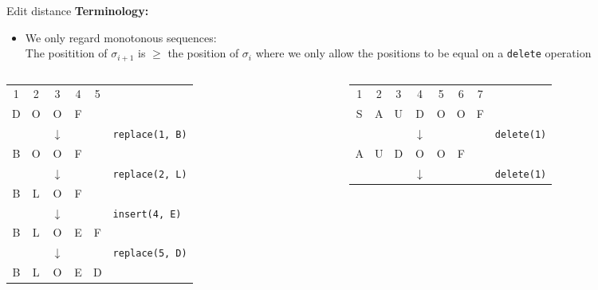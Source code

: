 \begin{frame}{Edit distance}
  \textbf{Terminology:}
  \begin{itemize}
    \item<2->
      We only regard {\color{Mittel-Blau}monotonous} sequences:\\
      The positition of $\sigma_{i+1}$ is $\geq$ the position of $\sigma_i$
      where we only allow the positions to be equal on a \texttt{delete}
      operation
  \end{itemize}
  \begin{columns}
    \begin{column}{0.5\linewidth}
      \begin{center}
        \begin{tabular}{c@{}c@{}c@{}c@{}cl}
          1 & 2 & 3 & 4 & 5\\
          D & O & O & F\\
          {} & {} & $\downarrow$ & {} & {} &
          \texttt{replace({\color{Mittel-Blau}1}, B)}\\
          B & O & O & F\\
          {} & {} & $\downarrow$ & {} & {} &
          \texttt{replace({\color{Mittel-Blau}2}, L)}\\
          B & L & O & F\\
          {} & {} & $\downarrow$ & {} & {} &
          \texttt{insert({\color{Mittel-Blau}4}, E)}\\
          B & L & O & E & F\\
          {} & {} & $\downarrow$ & {} & {} &
          \texttt{replace({\color{Mittel-Blau}5}, D)}\\
          B & L & O & E & D
        \end{tabular}
      \end{center}
    \end{column}
    \begin{column}{0.5\linewidth}
      \begin{center}
        \begin{tabular}{c@{}c@{}c@{}c@{}c@{}c@{}cl}
          1 & 2 & 3 & 4 & 5 & 6 & 7\\
          S & A & U & D & O & O & F\\
          {} & {} & {} & $\downarrow$ & {} & {} & {} &
          \texttt{delete({\color{Mittel-Blau}1})}\\
          A & U & D & O & O & F\\
          {} & {} & {} & $\downarrow$ & {} & {} & {} &
          \texttt{delete({\color{Mittel-Blau}1})}\\

\end{tabular}
\end{center}
\end{column}
\end{columns}
\end{frame}
